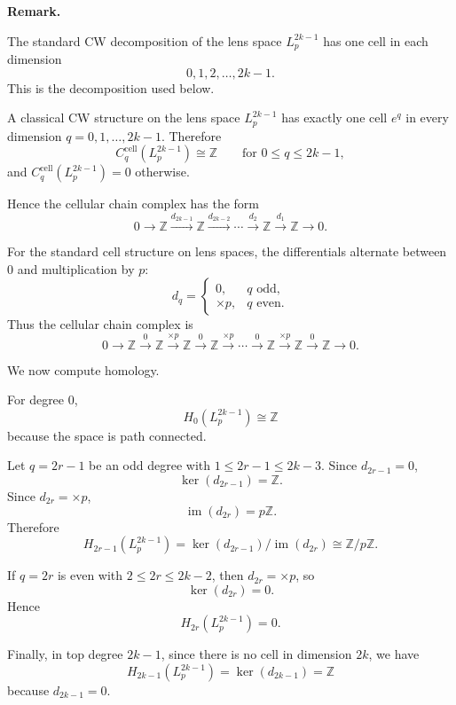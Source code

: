\begin{solution}

\medskip
\noindent\textbf{Remark.}\par
\smallskip

The standard CW decomposition of the lens space \(L_p^{2k-1}\) has one cell in each dimension
\[
0,1,2,\dots,2k-1.
\]
This is the decomposition used below.

A classical CW structure on the lens space \(L_p^{2k-1}\) has exactly one cell \(e^q\) in every dimension \(q=0,1,\dots,2k-1\). Therefore
\[
C_q^{\mathrm{cell}}(L_p^{2k-1})\cong \mathbb Z
\qquad \text{for } 0\le q\le 2k-1,
\]
and \(C_q^{\mathrm{cell}}(L_p^{2k-1})=0\) otherwise.

Hence the cellular chain complex has the form
\[
0 \to \mathbb Z \xrightarrow{d_{2k-1}} \mathbb Z \xrightarrow{d_{2k-2}} \cdots
\xrightarrow{d_2} \mathbb Z \xrightarrow{d_1} \mathbb Z \to 0.
\]

For the standard cell structure on lens spaces, the differentials alternate between \(0\) and multiplication by \(p\):
\[
d_q=
\begin{cases}
	0, & q \text{ odd},\\[4pt]
	\times p, & q \text{ even}.
\end{cases}
\]
Thus the cellular chain complex is
\[
0 \to \mathbb Z
\xrightarrow{0}
\mathbb Z
\xrightarrow{\times p}
\mathbb Z
\xrightarrow{0}
\mathbb Z
\xrightarrow{\times p}
\cdots
\xrightarrow{0}
\mathbb Z
\xrightarrow{\times p}
\mathbb Z
\xrightarrow{0}
\mathbb Z
\to 0.
\]

We now compute homology.

\par
\noindent
For degree \(0\),
\[
H_0(L_p^{2k-1})\cong \mathbb Z
\]
because the space is path connected.

\par
\noindent
Let \(q=2r-1\) be an odd degree with \(1\le 2r-1\le 2k-3\). Since \(d_{2r-1}=0\),
\[
\ker(d_{2r-1})=\mathbb Z.
\]
Since \(d_{2r}=\times p\),
\[
\operatorname{im}(d_{2r})=p\mathbb Z.
\]
Therefore
\[
H_{2r-1}(L_p^{2k-1})
=
\ker(d_{2r-1})/\operatorname{im}(d_{2r})
\cong
\mathbb Z/p\mathbb Z.
\]

\par
\noindent
If \(q=2r\) is even with \(2\le 2r\le 2k-2\), then \(d_{2r}=\times p\), so
\[
\ker(d_{2r})=0.
\]
Hence
\[
H_{2r}(L_p^{2k-1})=0.
\]

\par
\noindent
Finally, in top degree \(2k-1\), since there is no cell in dimension \(2k\), we have
\[
H_{2k-1}(L_p^{2k-1})=\ker(d_{2k-1})=\mathbb Z
\]
because \(d_{2k-1}=0\).


\end{solution}
